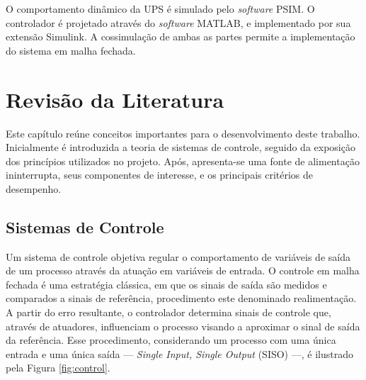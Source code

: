 \documentclass[repeatfields,oneside]{tcc}
\begin{document}
O comportamento dinâmico da UPS é simulado pelo \textit{software} PSIM.
O controlador é projetado através do \textit{software} MATLAB, e implementado por sua extensão Simulink.
A cossimulação de ambas as partes permite a implementação do sistema em malha fechada.







\chapter{Revisão da Literatura}\label{sec:revisao}

Este capítulo reúne conceitos importantes para o desenvolvimento deste trabalho.
Inicialmente é introduzida a teoria de sistemas de controle, seguido da exposição dos princípios utilizados no projeto.
Após, apresenta-se uma fonte de alimentação ininterrupta, seus componentes de interesse, e os principais critérios de desempenho.

\section{Sistemas de Controle}\label{sec:controle}

Um sistema de controle objetiva regular o comportamento de variáveis de saída de um processo através da atuação em variáveis de entrada.
O controle em malha fechada é uma estratégia clássica, em que os sinais de saída são medidos e comparados a sinais de referência, procedimento este denominado realimentação.
A partir do erro resultante, o controlador determina sinais de controle que, através de atuadores, influenciam o processo visando a aproximar o sinal de saída da referência.
Esse procedimento, considerando um processo com uma única entrada e uma única saída --- \textit{Single Input, Single Output} (SISO) ---, é ilustrado pela Figura \ref{fig:control}.
\end{document}
